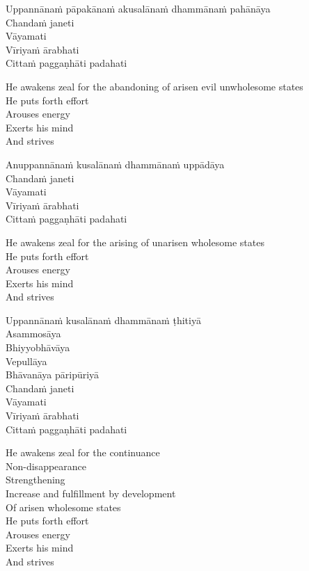 Uppannānaṁ pāpakānaṁ akusalānaṁ dhammānaṁ pahānāya\\
Chandaṁ janeti\\
Vāyamati\\
Vīriyaṁ ārabhati\\
Cittaṁ paggaṇhāti padahati

\begin{cprenglish}
  He awakens zeal for the abandoning of arisen evil unwholesome states\\
  He puts forth effort\\
  Arouses energy\\
  Exerts his mind\\
  And strives
\end{cprenglish}

Anuppannānaṁ kusalānaṁ dhammānaṁ uppādāya\\
Chandaṁ janeti\\
Vāyamati\\
Vīriyaṁ ārabhati\\
Cittaṁ paggaṇhāti padahati

\begin{cprenglish}
  He awakens zeal for the arising of unarisen wholesome states\\
  He puts forth effort\\
  Arouses energy\\
  Exerts his mind\\
  And strives
\end{cprenglish}

Uppannānaṁ kusalānaṁ dhammānaṁ ṭhitiyā\\
Asammosāya\\
Bhiyyobhāvāya\\
Vepullāya\\
Bhāvanāya pāripūriyā\\
Chandaṁ janeti\\
Vāyamati\\
Vīriyaṁ ārabhati\\
Cittaṁ paggaṇhāti padahati

\begin{cprenglish}
  He awakens zeal for the continuance\\
  Non-disappearance\\
  Strengthening\\
  Increase and fulfillment by development\\
  Of arisen wholesome states\\
  He puts forth effort\\
  Arouses energy\\
  Exerts his mind\\
  And strives
\end{cprenglish}

